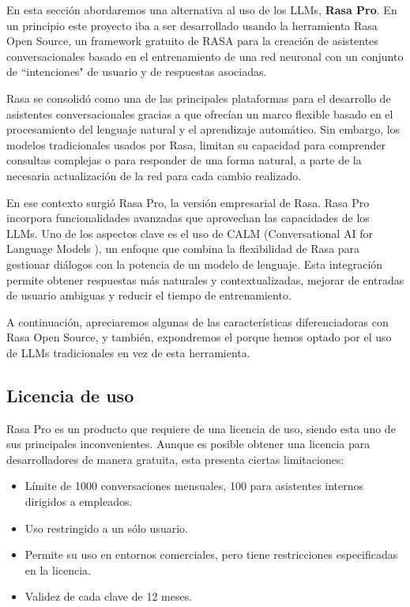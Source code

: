         En esta sección abordaremos una alternativa al uso de los LLMs, \textbf{Rasa Pro}. En un principio este proyecto iba a ser desarrollado usando la herramienta Rasa Open Source, un framework gratuito de RASA para la creación de asistentes conversacionales basado en el entrenamiento de una red neuronal con un conjunto de ``intenciones" de usuario y de respuestas asociadas.

        \noindent Rasa se consolidó como una de las principales plataformas para el desarrollo de asistentes conversacionales gracias a que ofrecían un marco flexible basado en el procesamiento del lenguaje natural y el aprendizaje automático. Sin embargo, los modelos tradicionales usados por Rasa, limitan su capacidad para comprender consultas complejas o para responder de una forma natural, a parte de la necesaria actualización de la red para cada cambio realizado.

        \noindent En ese contexto surgió Rasa Pro, la versión empresarial de Rasa. Rasa Pro incorpora funcionalidades avanzadas que aprovechan las capacidades de los LLMs. Uno de los aspectos clave es el uso de CALM (Conversational AI for Language Models \cite{0008_RasaCalm}), un enfoque que combina la flexibilidad de Rasa para gestionar diálogos con la potencia de un modelo de lenguaje. Esta integración permite obtener respuestas más naturales y contextualizadas, mejorar de entradas de usuario ambiguas y reducir el tiempo de entrenamiento.

        \noindent A continuación, apreciaremos algunas de las características diferenciadoras con Rasa Open Source, y también, expondremos el porque hemos optado por el uso de LLMs tradicionales en vez de esta herramienta.

        \subsection{Licencia de uso}

            Rasa Pro es un producto que requiere de una licencia de uso, siendo esta uno de sus principales inconvenientes. Aunque es posible obtener una licencia para desarrolladores de manera gratuita, esta presenta ciertas limitaciones:

            \begin{itemize}
                \item Límite de 1000 conversaciones mensuales, 100 para asistentes internos dirigidos a empleados.
                \item Uso restringido a un sólo usuario.
                \item Permite su uso en entornos comerciales, pero tiene restricciones especificadas en la licencia.
                \item Validez de cada clave de 12 meses.
            \end{itemize}

